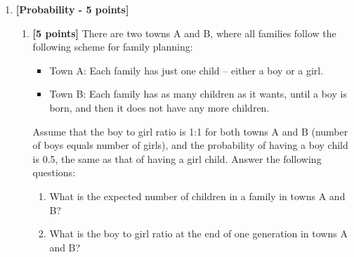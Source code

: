 \begin{enumerate}
\item {\bf [Probability - 5 points]}
\begin{enumerate}

\item {\bf [5 points]} There are two towns A and B, where all families follow the following scheme for family planning:
\begin{itemize}
\item Town A: Each family has just one child -- either a boy or a girl.
\item Town B: Each family has as many children as it wants, until a boy is born, and then it does not have any more children.
\end{itemize}
Assume that the boy to girl ratio is 1:1 for both towns A and B (number of boys equals number of girls), and the probability of having a boy child is 0.5, the same as that of having a girl child. Answer the following questions:
\begin{enumerate}
\item What is the expected number of children in a family in towns A and B?
\item What is the boy to girl ratio at the end of one generation in towns A and B?
\end{enumerate}
\end{enumerate}

\end{enumerate}


